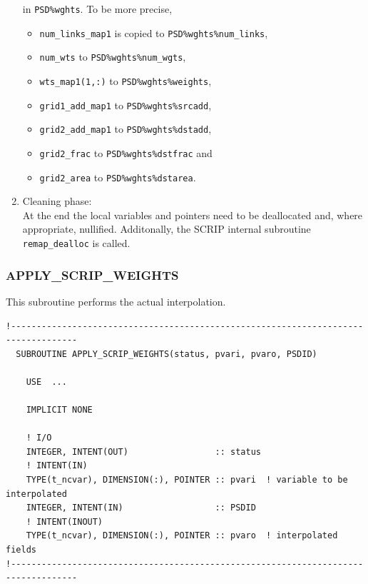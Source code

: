 \documentclass[11pt,twoside]{article}
\begin{document}
\begin{enumerate}
in \verb|PSD%wghts|. To be more precise,
\begin{itemize}
\item  \verb|num_links_map1|  is copied to \verb|PSD%wghts%num_links|, 
\item \verb|num_wts| to \verb|PSD%wghts%num_wgts|,
\item \verb|wts_map1(1,:)| to \verb|PSD%wghts%weights|,
\item \verb|grid1_add_map1| to \verb|PSD%wghts%srcadd|,
\item \verb|grid2_add_map1| to \verb|PSD%wghts%dstadd|,
\item \verb|grid2_frac| to \verb|PSD%wghts%dstfrac| and
\item \verb|grid2_area| to \verb|PSD%wghts%dstarea|.
\end{itemize}
\item Cleaning phase:\\
At the end the local variables and pointers need to be deallocated and, where
appropriate, nullified. Additonally, the SCRIP internal
subroutine \verb|remap_dealloc| is called.
\end{enumerate}


\subsubsection{APPLY\_SCRIP\_WEIGHTS\label{APPLYSWEIGHTS}}
This subroutine performs the actual interpolation. 
\begin{verbatim}
!-----------------------------------------------------------------------------------
  SUBROUTINE APPLY_SCRIP_WEIGHTS(status, pvari, pvaro, PSDID)

    USE  ...

    IMPLICIT NONE

    ! I/O
    INTEGER, INTENT(OUT)                 :: status
    ! INTENT(IN)
    TYPE(t_ncvar), DIMENSION(:), POINTER :: pvari  ! variable to be interpolated
    INTEGER, INTENT(IN)                  :: PSDID
    ! INTENT(INOUT)
    TYPE(t_ncvar), DIMENSION(:), POINTER :: pvaro  ! interpolated fields
!-----------------------------------------------------------------------------------
\end{verbatim}
\end{document}
